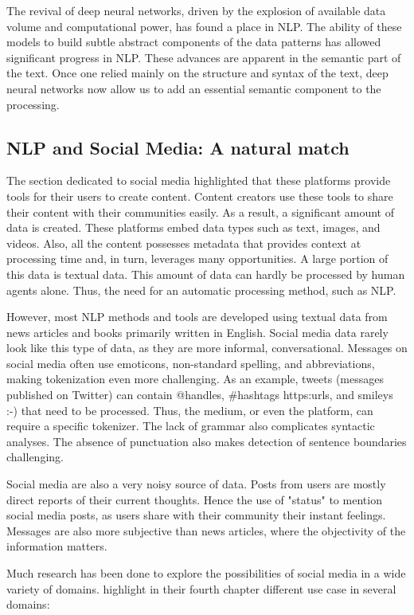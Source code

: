 The revival of deep neural networks, driven by the explosion of available data volume and computational power, has found a place in NLP.
The ability of these models to build subtle abstract components of the data patterns has allowed significant progress in NLP.
These advances are apparent in the semantic part of the text.
Once one relied mainly on the structure and syntax of the text, deep neural networks now allow us to add an essential semantic component to the processing.

\subsection{NLP and Social Media: A natural match}
The section dedicated to social media highlighted that these platforms provide tools for their users to create content.
Content creators use these tools to share their content with their communities easily.
As a result, a significant amount of data is created.
These platforms embed data types such as text, images, and videos.
Also, all the content possesses metadata that provides context at processing time and, in turn, leverages many opportunities.
A large portion of this data is textual data.
This amount of data can hardly be processed by human agents alone.
Thus, the need for an automatic processing method, such as NLP.

However, most NLP methods and tools are developed using textual data from news articles and books primarily written in English.
Social media data rarely look like this type of data, as they are more informal, conversational.
Messages on social media often use emoticons, non-standard spelling, and abbreviations, making tokenization even more challenging.
As an example, tweets (messages published on Twitter) can contain @handles, \#hashtags https:\/\/urls, and smileys :-) that need to be processed.
Thus, the medium, or even the platform, can require a specific tokenizer.
The lack of grammar also complicates syntactic analyses.
The absence of punctuation also makes detection of sentence boundaries challenging.

Social media are also a very noisy source of data.
Posts from users are mostly direct reports of their current thoughts.
Hence the use of "status" to mention social media posts, as users share with their community their instant feelings.
Messages are also more subjective than news articles, where the objectivity of the information matters.

Much research has been done to explore the possibilities of social media in a wide variety of domains.
highlight in their fourth chapter different use case in several domains:

